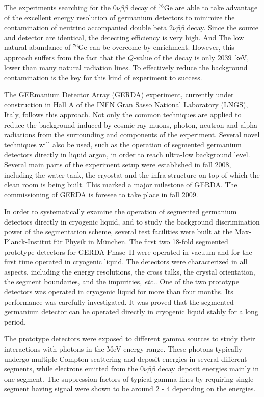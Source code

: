 The experiments searching for the $0\nu\beta\beta$ decay of $^{76}$Ge are able to take advantage of the excellent energy resolution of germanium detectors to minimize the contamination of neutrino accompanied double beta $2\nu\beta\beta$ decay. Since the source and detector are identical, the detecting efficiency is very high. And The low natural abundance of $^{76}$Ge can be overcome by enrichment. However, this approach suffers from the fact that the $Q$-value of the decay is only $2039$~keV, lower than many natural radiation lines. To effectively reduce the background contamination is the key for this kind of experiment to success.

The GERmanium Detector Array (GERDA) experiment, currently under construction in Hall A of the INFN Gran Sasso National Laboratory (LNGS), Italy, follows this approach. Not only the common techniques are applied to reduce the background induced by cosmic ray muons, photon, neutron and alpha radiations from the surrounding and components of the experiment. Several novel techniques will also be used, such as the operation of segmented germanium detectors directly in liquid argon, in order to reach ultra-low background level. Several main parts of the experiment setup were established in fall 2008, including the water tank, the cryostat and the infra-structure on top of which the clean room is being built. This marked a major milestone of GERDA. The commissioning of GERDA is foresee to take place in fall 2009.

In order to systematically examine the operation of segmented germanium detectors directly in cryogenic liquid, and to study the background discrimination power of the segmentation scheme, several test facilities were built at the Max-Planck-Institut f\"ur Physik in M\"unchen. The first two 18-fold segmented prototype detectors for GERDA Phase~II were operated in vacuum and for the first time operated in cryogenic liquid. The detectors were characterized in all aspects, including the energy resolutions, the cross talks, the crystal orientation, the segment boundaries, and the impurities, \textit{etc.}. One of the two prototype detectors was operated in cryogenic liquid for more than four months. Its performance was carefully investigated. It was proved that the segmented germanium detector can be operated directly in cryogenic liquid stably for a long period.

The prototype detectors were exposed to different gamma sources to study their interactions with photons in the MeV-energy range. These photons typically undergo multiple Compton scattering and deposit energies in several different segments, while electrons emitted from the $0\nu\beta\beta$ decay deposit energies mainly in one segment. The suppression factors of typical gamma lines by requiring single segment having signal were shown to be around 2 - 4 depending on the energies.

